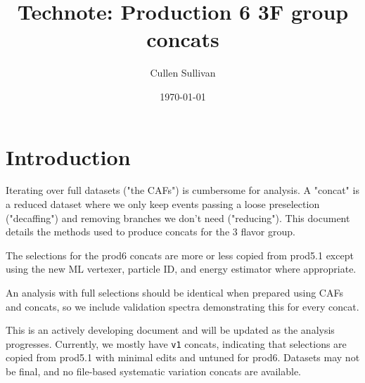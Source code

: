 \documentclass{article}
\title{Technote: Production 6 3F group concats}
\author{Cullen Sullivan}
\date{\today}
\begin{document}
\maketitle

\tableofcontents

\section{Introduction}
Iterating over full datasets ("the CAFs") is cumbersome for analysis. A "concat" is a reduced dataset where we only keep events passing a loose preselection ("decaffing") and removing branches we don't need ("reducing").
This document details the methods used to produce concats for the 3 flavor group.

The selections for the prod6 concats are more or less copied from prod5.1 \cite{ref:prod51_concats} except using the new ML vertexer, particle ID, and energy estimator where appropriate.

An analysis with full selections should be identical when prepared using CAFs and concats, so we include validation spectra demonstrating this for every concat.

This is an actively developing document and will be updated as the analysis progresses. Currently, we mostly have \texttt{v1} concats, indicating that selections are copied from prod5.1 with minimal edits and untuned for prod6. Datasets may not be final, and no file-based systematic variation concats are available.

\end{document}
